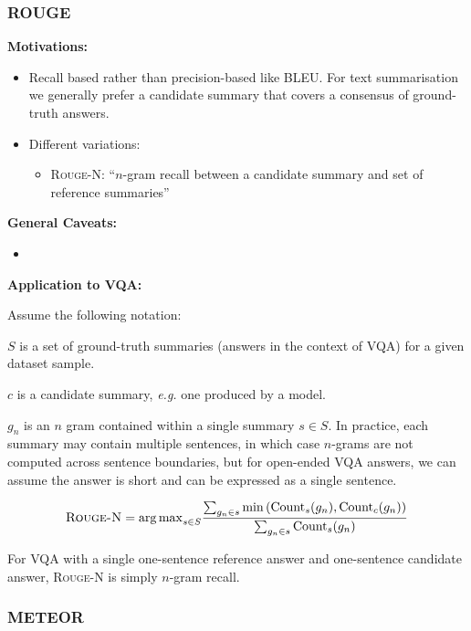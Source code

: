 \subsubsection{ROUGE}

\textbf{Motivations:}

\begin{itemize}
    \item Recall based rather than precision-based like BLEU. For text summarisation we generally prefer a candidate summary that covers a consensus of ground-truth answers.
    \item Different variations:
    \begin{itemize}
        \item \textsc{Rouge-N}: ``\(n\)-gram recall between a candidate summary and set of reference summaries''
    \end{itemize}
\end{itemize}

\textbf{General Caveats:}

\begin{itemize}
    \item 
\end{itemize}

\textbf{Application to VQA:}

Assume the following notation:

\(S\) is a set of ground-truth summaries (answers in the context of VQA) for a given dataset sample.

\(c\) is a candidate summary, \textit{e.g.} one produced by a model.

\(g_n\) is an \(n\) gram contained within a single summary \(s \in S\). In practice, each summary may contain multiple sentences, in which case \(n\)-grams are not computed across sentence boundaries, but for open-ended VQA answers, we can assume the answer is short and can be expressed as a single sentence.

\begin{equation*}
    \textsc{Rouge-N} = {\arg \max}_{s\in S} \frac{
        \sum_{g_n \in s} \min \left(\text{Count}_s(g_n), \text{Count}_c(g_n) \right)
    }{
        \sum_{g_n \in s} \text{Count}_s(g_n)
    }
\end{equation*}

For VQA with a single one-sentence reference answer and one-sentence candidate answer, \textsc{Rouge-N} is simply \(n\)-gram recall.

\subsubsection{METEOR}

